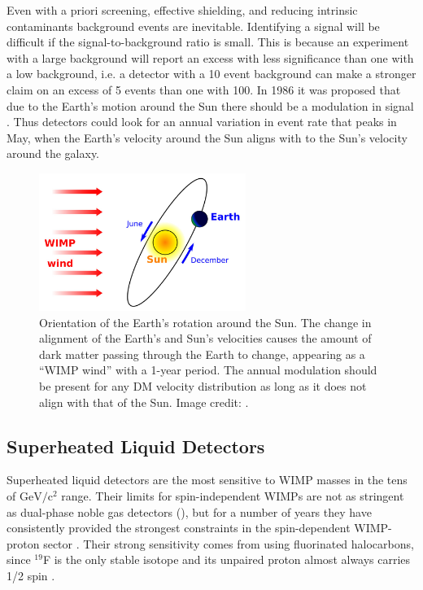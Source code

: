  
Even with a priori screening, effective shielding, and reducing intrinsic contaminants background events are inevitable.  Identifying a
signal will be difficult if the signal-to-background ratio is small.  This is because
an experiment with a large background will report an excess with less significance than one with a low background, i.e. a detector with a
10 event
background can make a stronger claim on an excess of 5 events than one with 100.  In 1986 it was proposed
that due to the Earth's motion around the Sun there should be a modulation in signal .  Thus
detectors could look for an annual variation in event rate that peaks in May, when the Earth's velocity around the
Sun aligns with to the Sun's velocity around the galaxy.

\begin{figure}
\includegraphics[width=0.6\textwidth]{wimp_wind}
\caption{Orientation of the Earth's rotation around the Sun.  The change in alignment of the Earth's and Sun's velocities causes the
amount of dark matter passing through the Earth to change, appearing as a ``WIMP wind'' with a 1-year period.  The annual modulation
should be present for any DM velocity distribution as long as it does not align with that of the Sun.  Image credit:
.}
\label{fig:direct_detect_modulation}
\end{figure}
 
  
 
\subsection{Superheated Liquid Detectors}
\label{subsec:bubbles}
Superheated liquid detectors are the most sensitive to WIMP masses in the tens of $\mathrm{GeV/c^2}$ range.  Their limits for
spin-independent
WIMPs are not as stringent as dual-phase noble gas detectors (), but for a number of years they have
consistently provided the strongest constraints in the spin-dependent WIMP-proton sector .  Their strong
sensitivity comes from using fluorinated
halocarbons, since $^{19}$F is the only stable isotope and its unpaired proton
almost always carries 1/2 spin .

